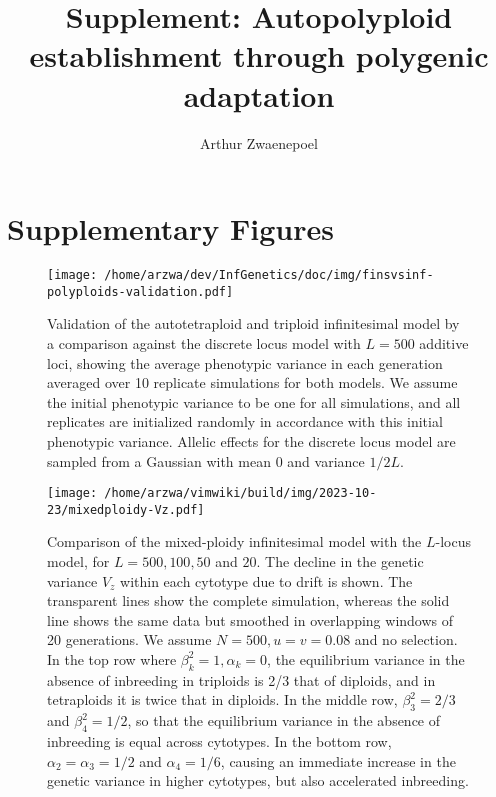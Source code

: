 \documentclass[11pt,a4paper]{article}
\begin{document}
\title{Supplement: Autopolyploid establishment through polygenic adaptation}
\author{Arthur Zwaenepoel}
\date{\vspace{-5ex}}
\maketitle
\tableofcontents
\clearpage

\section{Supplementary Figures}

\begin{figure}[H]
\centering
\texttt{[image: /home/arzwa/dev/InfGenetics/doc/img/finsvsinf-polyploids-validation.pdf]}
\caption{
Validation of the autotetraploid and triploid infinitesimal model by a
comparison against the discrete locus model with $L=500$ additive loci, showing
the average phenotypic variance in each generation averaged over 10 replicate
simulations for both models.
We assume the initial phenotypic variance to be one for all simulations, and
all replicates are initialized randomly in accordance with this initial
phenotypic variance.
Allelic effects for the discrete locus model are sampled from a Gaussian with
mean $0$ and variance $1/2L$.
\label{fig:fininf}}
\end{figure}

\begin{figure}[H]
\centering
\texttt{[image: /home/arzwa/vimwiki/build/img/2023-10-23/mixedploidy-Vz.pdf]}
\caption{Comparison of the mixed-ploidy infinitesimal model with the
\(L\)-locus model, for \(L=500,100,50\) and \(20\). The decline in the
genetic variance \(V_z\) within each cytotype due to drift is shown. The
transparent lines show the complete simulation, whereas the solid line
shows the same data but smoothed in overlapping windows of 20
generations. We assume \(N=500, u=v=0.08\) and no selection. In the top
row where \(\beta_k^2=1, \alpha_k=0\), the equilibrium variance in the
absence of inbreeding in triploids is 2/3 that of diploids, and in
tetraploids it is twice that in diploids. In the middle row,
\(\beta_3^2=2/3\) and \(\beta_4^2=1/2\), so that the equilibrium
variance in the absence of inbreeding is equal across cytotypes. In the
bottom row, \(\alpha_2= \alpha_3 =1/2\) and \(\alpha_4=1/6\), causing an
immediate increase in the genetic variance in higher cytotypes, but also
accelerated inbreeding. \label{fig:vz}}
\end{figure}
\end{document}
